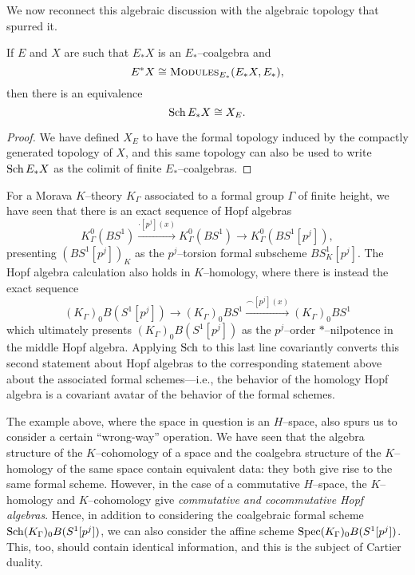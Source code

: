 We now reconnect this algebraic discussion with the algebraic topology that spurred it.

\begin{lemma}
If \(E\) and \(X\) are such that \(E_* X\) is an \(E_*\)--coalgebra and \[E^* X \cong \normalfont\textsc{Modules}_{E_*}(E_* X, E_*),\] then there is an equivalence \[\operatorname{Sch} E_* X \cong X_E.\]
\end{lemma}
\begin{proof}
We have defined \(X_E\) to have the formal topology induced by the compactly generated topology of \(X\), and this same topology can also be used to write \(\operatorname{Sch} E_* X\) as the colimit of finite \(E_*\)--coalgebras.
\end{proof}

\begin{example}\label{KtheoryOfClassifyingSpace}
For a Morava \(K\)--theory \(K_\Gamma\) associated to a formal group \(\Gamma\) of finite height, we have seen that there is an exact sequence of Hopf algebras \[K_\Gamma^0(BS^1) \xrightarrow{\cdot [p^j](x)} K_\Gamma^0(BS^1) \to K_\Gamma^0(BS^1[p^j]),\] presenting \((BS^1[p^j])_K\) as the \(p^j\)--torsion formal subscheme \(BS^1_K[p^j]\).  The Hopf algebra calculation also holds in \(K\)--homology, where there is instead the exact sequence \[(K_\Gamma)_0 B(S^1[p^j]) \to (K_\Gamma)_0 BS^1 \xrightarrow{\frown [p^j](x)} (K_\Gamma)_0 BS^1\] which ultimately presents \((K_\Gamma)_0 B(S^1[p^j])\) as the \(p^j\)--order \(\ast\)--nilpotence in the middle Hopf algebra.  Applying \(\operatorname{Sch}\) to this last line covariantly converts this second statement about Hopf algebras to the corresponding statement above about the associated formal schemes---i.e., the behavior of the homology Hopf algebra is a covariant avatar of the behavior of the formal schemes.
\end{example}

The example above, where the space in question is an \(H\)--space, also spurs us to consider a certain ``wrong-way'' operation.  We have seen that the algebra structure of the \(K\)--cohomology of a space and the coalgebra structure of the \(K\)--homology of the same space contain equivalent data: they both give rise to the same formal scheme.  However, in the case of a commutative \(H\)--space, the \(K\)--homology and \(K\)--cohomology give \emph{commutative and cocommutative Hopf algebras}.  Hence, in addition to considering the coalgebraic formal scheme \(\operatorname{Sch} (K_\Gamma)_0 B(S^1[p^j])\), we can also consider the affine scheme \(\operatorname{Spec} (K_\Gamma)_0 B(S^1[p^j])\).  This, too, should contain identical information, and this is the subject of Cartier duality.

